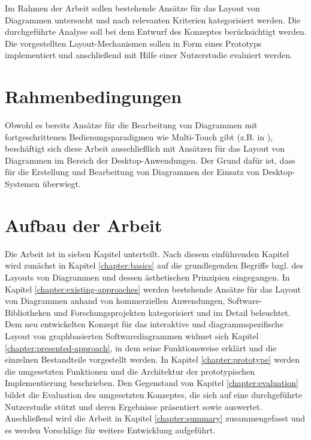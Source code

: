 Im Rahmen der Arbeit sollen bestehende Ansätze für das Layout von Diagrammen untersucht und nach relevanten Kriterien kategorisiert werden. Die durchgeführte Analyse soll bei dem Entwurf des Konzeptes berücksichtigt werden. Die vorgestellten Layout-Mechanismen sollen in Form eines Prototyps implementiert und anschließend mit Hilfe einer Nutzerstudie evaluiert werden.

\section{Rahmenbedingungen}
\label{sec:thesis-conditions}

Obwohl es bereits Ansätze für die Bearbeitung von Diagrammen mit fortgeschrittenen Bedienungsparadigmen wie Multi-Touch gibt (z.B. in \cite{FrischHeydekorn10Diagram}), beschäftigt sich diese Arbeit ausschließlich mit Ansätzen für das Layout von Diagrammen im Bereich der Desktop-Anwendun\-gen. Der Grund dafür ist, dass für die Erstellung und Bearbeitung von Diagrammen der Einsatz von Desktop-Systemen überwiegt.

\section{Aufbau der Arbeit}

Die Arbeit ist in sieben Kapitel unterteilt. Nach diesem einführenden Kapitel wird zunächst in Kapitel \ref{chapter:basics} auf die grundlegenden Begriffe bzgl. des Layouts von Diagrammen und dessen ästhetischen Prinzipien eingegangen. In Kapitel \ref{chapter:existing-approaches} werden bestehende Ansätze für das Layout von Diagrammen anhand von kommerziellen Anwendungen, Software-Bibliotheken und Forschungsprojekten kategorisiert und im Detail beleuchtet. Dem neu entwickelten Konzept für das interaktive und diagrammspezifische Layout von graphbasierten Softwarediagrammen widmet sich Kapitel \ref{chapter:presented-approach}, in dem seine Funktionsweise erklärt und die einzelnen Bestandteile vorgestellt werden. In Kapitel \ref{chapter:prototype} werden die umgesetzten Funktionen und die Architektur der prototypischen Implementierung beschrieben. Den Gegenstand von Kapitel \ref{chapter:evaluation} bildet die Evaluation des umgesetzten Konzeptes, die sich auf eine durchgeführte Nutzerstudie stützt und deren Ergebnisse präsentiert sowie auswertet. Anschließend wird die Arbeit in Kapitel \ref{chapter:summary} zusammengefasst und es werden Vorschläge für weitere Entwicklung aufgeführt.
